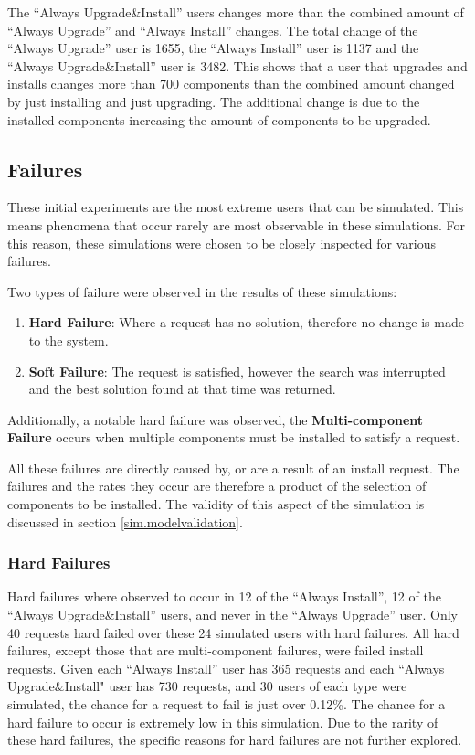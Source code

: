 The ``Always Upgrade\&Install'' users changes more than the combined amount of ``Always Upgrade'' and ``Always Install'' changes.
The total change of the ``Always Upgrade'' user is 1655, the ``Always Install'' user is 1137 and the ``Always Upgrade\&Install'' user is 3482.
This shows that a user that upgrades and installs changes more than 700 components than the combined amount changed by just installing and just upgrading.
The additional change is due to the installed components increasing the amount of components to be upgraded.


\subsection{Failures}
\label{exp.failures}
These initial experiments are the most extreme users that can be simulated.
This means phenomena that occur rarely are most observable in these simulations.
For this reason, these simulations were chosen to be closely inspected for various failures.

Two types of failure were observed in the results of these simulations:
\begin{enumerate}
  \item \textbf{Hard Failure}: Where a request has no solution, therefore no change is made to the system.
  \item \textbf{Soft Failure}: The request is satisfied, however the search was interrupted and the best solution found at that time was returned.
\end{enumerate}
Additionally, a notable hard failure was observed, the \textbf{Multi-component Failure} occurs when multiple components must be installed to satisfy a request. 

All these failures are directly caused by, or are a result of an install request.
The failures and the rates they occur are therefore a product of the selection of components to be installed.
The validity of this aspect of the simulation is discussed in section \ref{sim.modelvalidation}. 

\subsubsection{Hard Failures}
Hard failures where observed to occur in 12 of the ``Always Install'', 12 of the ``Always Upgrade\&Install'' users, and never in the ``Always Upgrade'' user.
Only 40 requests hard failed over these 24 simulated users with hard failures.
All hard failures, except those that are multi-component failures, were failed install requests.
Given each ``Always Install'' user has 365 requests and each ``Always Upgrade\&Install" user has 730 requests, 
and 30 users of each type were simulated, the chance for a request to fail is just over 0.12\%.
The chance for a hard failure to occur is extremely low in this simulation.
Due to the rarity of these hard failures, the specific reasons for hard failures are not further explored.

